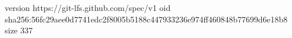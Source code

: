version https://git-lfs.github.com/spec/v1
oid sha256:56fc29aee0d7741edc2f8005b5188c447933236e974ff460848b77699d6e18b8
size 337
